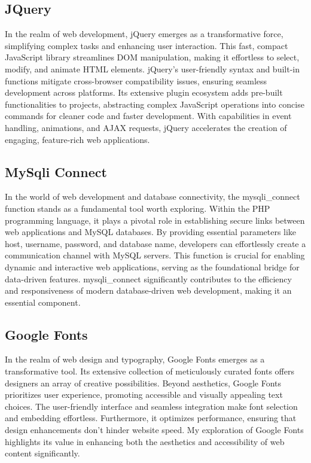 \subsection{JQuery}
In the realm of web development, jQuery emerges as a transformative force, simplifying complex tasks and enhancing user interaction. This fast, compact JavaScript library streamlines DOM manipulation, making it effortless to select, modify, and animate HTML elements. jQuery's user-friendly syntax and built-in functions mitigate cross-browser compatibility issues, ensuring seamless development across platforms. Its extensive plugin ecosystem adds pre-built functionalities to projects, abstracting complex JavaScript operations into concise commands for cleaner code and faster development. With capabilities in event handling, animations, and AJAX requests, jQuery accelerates the creation of engaging, feature-rich web applications.
\subsection{MySqli Connect}
In the world of web development and database connectivity, the mysqli\_connect function stands as a fundamental tool worth exploring. Within the PHP programming language, it plays a pivotal role in establishing secure links between web applications and MySQL databases. By providing essential parameters like host, username, password, and database name, developers can effortlessly create a communication channel with MySQL servers. This function is crucial for enabling dynamic and interactive web applications, serving as the foundational bridge for data-driven features. mysqli\_connect significantly contributes to the efficiency and responsiveness of modern database-driven web development, making it an essential component.
\subsection{Google Fonts}
In the realm of web design and typography, Google Fonts emerges as a transformative tool. Its extensive collection of meticulously curated fonts offers designers an array of creative possibilities. Beyond aesthetics, Google Fonts prioritizes user experience, promoting accessible and visually appealing text choices. The user-friendly interface and seamless integration make font selection and embedding effortless. Furthermore, it optimizes performance, ensuring that design enhancements don't hinder website speed. My exploration of Google Fonts highlights its value in enhancing both the aesthetics and accessibility of web content significantly.
